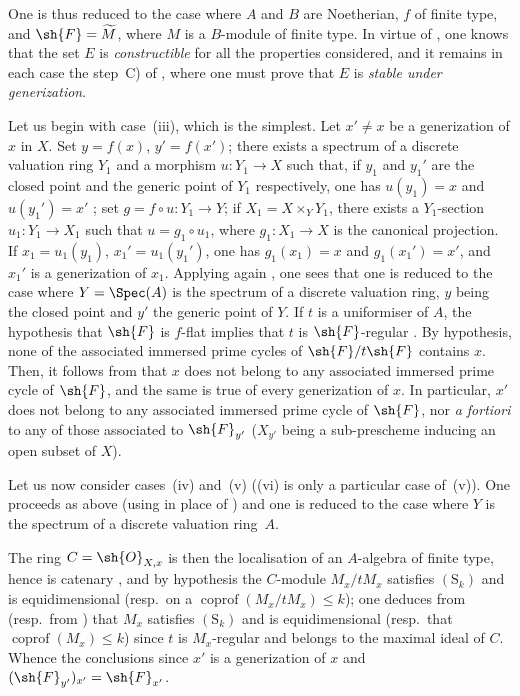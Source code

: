 One is thus reduced to the case where $A$ and $B$ are Noetherian, $f$ of finite type, and $\sh{F}=\widetilde{M}$, where $M$ is a $B$-module of finite type.
In virtue of , one knows that the set $E$ is \emph{constructible} for all the properties considered, and it remains in each case the step~C) of , where one must prove that $E$ is \emph{stable under generization}.

\begin{env}[12.1.1.1]
\label{IV.12.1.1.1}
Let us begin with case~(iii), which is the simplest.
Let $x'\neq x$ be a generization of $x$ in $X$.
Set $y=f(x)$, $y'=f(x')$; there exists a spectrum of a discrete valuation ring $Y_1$ and a morphism $u:Y_1\to X$ such that, if $y_1$ and $y_1'$ are the closed point and the generic point of $Y_1$ respectively, one has $u(y_1)=x$ and $u(y_1')=x'$ ; set $g=f\circ u:Y_1\to Y$; if $X_1=X\times_Y Y_1$, there exists a $Y_1$-section $u_1:Y_1\to X_1$ such that $u=g_1\circ u_1$, where $g_1:X_1\to X$ is the canonical projection.
If $x_1=u_1(y_1)$, $x_1'=u_1(y_1')$, one has $g_1(x_1)=x$ and $g_1(x_1')=x'$, and $x_1'$ is a generization of $x_1$.
Applying again , one sees
that one is reduced to the case where $Y=\Spec(A)$ is the spectrum of a discrete valuation ring, $y$ being the closed point and $y'$ the generic point of $Y$.
If $t$ is a uniformiser of $A$, the hypothesis that $\sh{F}$ is $f$-flat implies that $t$ is $\sh{F}$-regular .
By hypothesis, none of the associated immersed prime cycles of $\sh{F}/t\sh{F}$ contains $x$.
Then, it follows from  that $x$ does not belong to any associated immersed prime cycle of $\sh{F}$, and the same is true of every generization of $x$.
In particular, $x'$ does not belong to any associated immersed prime cycle of $\sh{F}$, nor \emph{a fortiori} to any of those associated to $\sh{F}_{y'}$ ($X_{y'}$ being a sub-prescheme inducing an open subset of $X$).
\end{env}

\begin{env}[12.1.1.2]
\label{IV.12.1.1.2}
Let us now consider cases~(iv) and~(v) ((vi) is only a particular case of~(v)).
One proceeds as above (using  in place of ) and one is reduced to the case where $Y$ is the spectrum of a discrete valuation ring~$A$.

The ring $C=\sh{O}_{X,x}$ is then the localisation of an $A$-algebra of finite type, hence is catenary , and by hypothesis the $C$-module $M_x/tM_x$ satisfies $(\mathrm{S}_k)$ and is equidimensional (resp.\ on a $\operatorname{coprof}(M_x/tM_x)\leqslant k$); one deduces from  (resp.\ from ) that $M_x$ satisfies $(\mathrm{S}_k)$ and is equidimensional (resp.\ that $\operatorname{coprof}(M_x)\leqslant k$) since $t$ is $M_x$-regular and belongs to the maximal ideal of $C$.
Whence the conclusions since $x'$ is a generization of $x$ and $(\sh{F}_{y'})_{x'}=\sh{F}_{x'}$.
\end{env}

